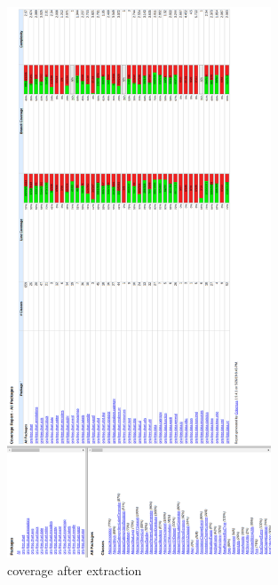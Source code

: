 \documentclass{article}
\begin{document}
\newpage
\begin{figure}[H]
\centering
	\includegraphics[width=0.7\textwidth]{coverage/AFTER.png}
	\caption{coverage after extraction}
\end{figure}
\end{document}

